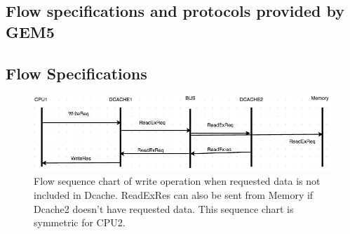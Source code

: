 \documentclass[12pt,frontmatter,copyright,thesis]{usfmanus}
\begin{document}
\begin{appendix}
\appendix
\chapter{Flow specifications and protocols provided by GEM5}
\section{Flow Specifications}
\begin{figure}[h]
\centering
 \includegraphics[width=4In]{figures/write3.png}
 \caption{\footnotesize Flow sequence chart of write operation when requested data is not included in Dcache. ReadExRes can also be sent from Memory if Dcache2 doesn't have requested data. This sequence chart is symmetric for CPU2. }
 \label{write3}


\end{figure}
\end{appendix}
\end{document}

